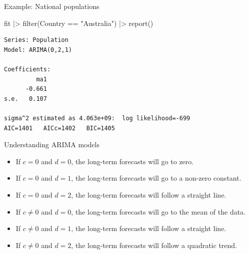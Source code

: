 \documentclass[
  14pt,
  ignorenonframetext,
  aspectratio=169,
]{beamer}
\newenvironment{Shaded}{\begin{snugshade}}{\end{snugshade}}
\newcommand{\FunctionTok}[1]{\textcolor[rgb]{0.00,0.00,0.00}{#1}}
\newcommand{\NormalTok}[1]{\textcolor[rgb]{0.00,0.00,0.00}{#1}}
\newcommand{\SpecialCharTok}[1]{\textcolor[rgb]{0.00,0.00,0.00}{#1}}
\newcommand{\StringTok}[1]{\textcolor[rgb]{0.31,0.60,0.02}{#1}}
\providecommand{\tightlist}{%
  \setlength{\itemsep}{0pt}\setlength{\parskip}{0pt}}\usepackage{longtable,booktabs,array}
\renewenvironment{Shaded}{\vspace*{0.15cm}\color{black}\fontsize{10}{10}\sf\begin{snugshade}\color{black}}{\end{snugshade}}
\begin{document}
\begin{frame}[fragile]{Example: National populations}
\protect\hypertarget{example-national-populations-1}{}
\fontsize{11}{12}\sf

\begin{Shaded}
\begin{Highlighting}[]
\NormalTok{fit }\SpecialCharTok{|\textgreater{}}
  \FunctionTok{filter}\NormalTok{(Country }\SpecialCharTok{==} \StringTok{"Australia"}\NormalTok{) }\SpecialCharTok{|\textgreater{}}
  \FunctionTok{report}\NormalTok{()}
\end{Highlighting}
\end{Shaded}

\begin{verbatim}
Series: Population 
Model: ARIMA(0,2,1) 

Coefficients:
         ma1
      -0.661
s.e.   0.107

sigma^2 estimated as 4.063e+09:  log likelihood=-699
AIC=1401   AICc=1402   BIC=1405
\end{verbatim}

\vspace*{3cm}
\end{frame}

\begin{frame}{Understanding ARIMA models}
\protect\hypertarget{understanding-arima-models}{}
\begin{itemize}
\tightlist
\item
  If \(c=0\) and \(d=0\), the long-term forecasts will go to zero.
\item
  If \(c=0\) and \(d=1\), the long-term forecasts will go to a non-zero
  constant.
\item
  If \(c=0\) and \(d=2\), the long-term forecasts will follow a straight
  line.
\item
  If \(c\ne0\) and \(d=0\), the long-term forecasts will go to the mean
  of the data.
\item
  If \(c\ne0\) and \(d=1\), the long-term forecasts will follow a
  straight line.
\item
  If \(c\ne0\) and \(d=2\), the long-term forecasts will follow a
  quadratic trend.
\end{itemize}
\end{frame}
\end{document}
